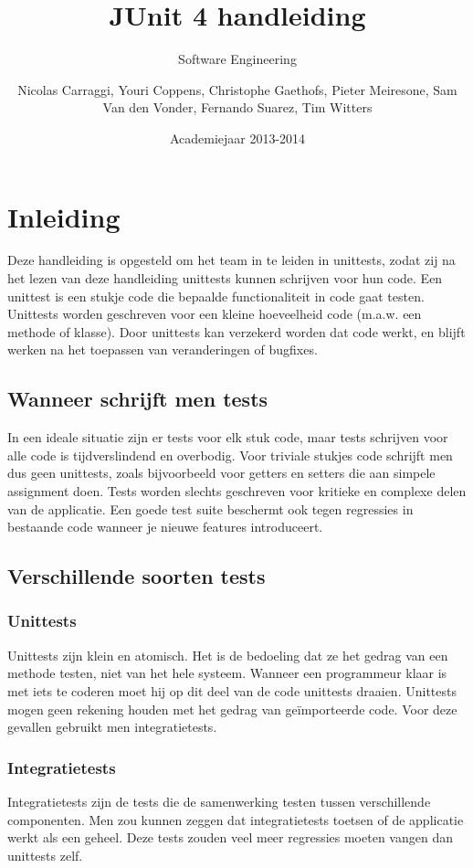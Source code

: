 \documentclass{book}
\author{Nicolas Carraggi, Youri Coppens, Christophe Gaethofs, Pieter Meiresone, Sam Van den Vonder, Fernando Suarez, Tim Witters}
\title{JUnit 4 handleiding}
\subtitle{Software Engineering}
\date{Academiejaar 2013-2014}
\begin{document}
\frontmatter
\makeassignment
\tableofcontents

\mainmatter

\chapter{Inleiding}
Deze handleiding is opgesteld om het team in te leiden in unittests, zodat zij na het lezen van deze handleiding unittests kunnen schrijven voor hun code. 
Een unittest is een stukje code die bepaalde functionaliteit in code gaat testen. 
Unittests worden geschreven voor een kleine hoeveelheid code (m.a.w. een methode of klasse). 
Door unittests kan verzekerd worden dat code werkt, en blijft werken na het toepassen van veranderingen of bugfixes.

\section{Wanneer schrijft men tests}
In een ideale situatie zijn er tests voor elk stuk code, maar tests schrijven voor alle code is tijdverslindend en overbodig. 
Voor triviale stukjes code schrijft men dus geen unittests, zoals bijvoorbeeld voor getters en setters die aan simpele assignment doen. 
Tests worden slechts geschreven voor kritieke en complexe delen van de applicatie. 
Een goede test suite beschermt ook tegen regressies in bestaande code wanneer je nieuwe features introduceert. 

\section{Verschillende soorten tests}
\subsection{Unittests}
Unittests zijn klein en atomisch. 
Het is de bedoeling dat ze het gedrag van een methode testen, niet van het hele systeem. 
Wanneer een programmeur klaar is met iets te coderen moet hij op dit deel van de code unittests draaien. 
Unittests mogen geen rekening houden met het gedrag van geïmporteerde code. 
Voor deze gevallen gebruikt men integratietests.
\subsection{Integratietests}
Integratietests zijn de tests die de samenwerking testen tussen verschillende componenten. 
Men zou kunnen zeggen dat integratietests toetsen of de applicatie werkt als een geheel. 
Deze tests zouden veel meer regressies moeten vangen dan unittests zelf. 
\end{document}
